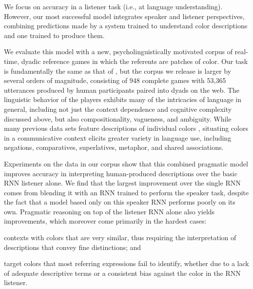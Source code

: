 \documentclass[11pt,letterpaper]{article}
\newcommand{\term}{\textit}
\renewcommand{\|}{\mid}
\begin{document}

We focus on accuracy in a listener task
(i.e., at language understanding).
However, our most successful model integrates speaker and listener perspectives,
combining predictions made by a system trained to understand color descriptions
and one trained to produce them.

We evaluate this model with a new, psycholinguistically motivated corpus of real-time, dyadic reference games in which
the referents are patches of color.
Our task is fundamentally the same as that of
, but the corpus we release is larger by several
orders of magnitude, consisting of 948 complete games with 53,365 utterances 
produced by human participants paired into dyads on the web. The linguistic
behavior of the players exhibits many of the intricacies of language
in general, including not just the context dependence and cognitive
complexity discussed above, but also compositionality, vagueness, and
ambiguity. While many previous data sets feature descriptions of
individual colors \cite{Cook2005,Munroe2010,Kawakami2016}, situating
colors in a communicative context elicits greater variety in language use,
including negations, comparatives, superlatives,
metaphor, and shared associations.

Experiments on the data in our corpus show that this combined pragmatic model
improves accuracy
in interpreting human-produced descriptions over the basic RNN listener
alone. We find that the largest improvement over the single RNN comes from
blending it with an RNN trained to perform the speaker task, despite the fact
that a model based only on this speaker RNN performs poorly on its own.
Pragmatic reasoning on top of the listener RNN alone also yields improvements,
which moreover come primarily in the hardest cases:
%
\begin{enumerate*}[label=\arabic*)]
\item contexts with colors that are very similar, thus requiring
  the interpretation of descriptions that convey fine distinctions;
  and
\item target colors that most referring expressions fail to identify,
  whether due to a lack of adequate descriptive terms or a consistent
  bias against the color in the RNN listener.
\end{enumerate*}
\end{document}
